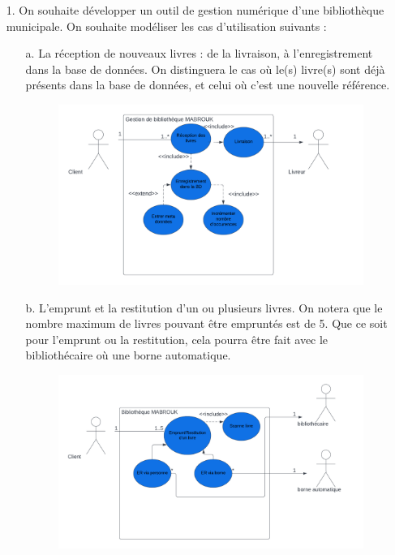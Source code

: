 \documentclass[12pt]{article}
\begin{document}
\begin{itemize}
		\item [1. ] On souhaite développer un outil de gestion numérique d’une bibliothèque municipale. On
		souhaite modéliser les cas d’utilisation suivants :
		\begin{itemize}
			\item[a. ] La réception de nouveaux livres : de la livraison, à l’enregistrement dans la base de
			données. On distinguera le cas où le(s) livre(s) sont déjà présents dans la base de
			données, et celui où c’est une nouvelle référence.
				\begin{figure}[!hbtp]
				\includegraphics[scale=0.75]{capture1_S_1.png}
			\end{figure}
			\item[b. ] L’emprunt et la restitution d’un ou plusieurs livres. On notera que le nombre
			maximum de livres pouvant être empruntés est de 5. Que ce soit pour l’emprunt ou
			la restitution, cela pourra être fait avec le bibliothécaire où une borne automatique.
			\newpage
			\begin{figure}[!hbtp]
				\includegraphics[scale=0.75]{capture2_S.png}

\end{figure}
\end{itemize}
\end{itemize}
\end{document}
